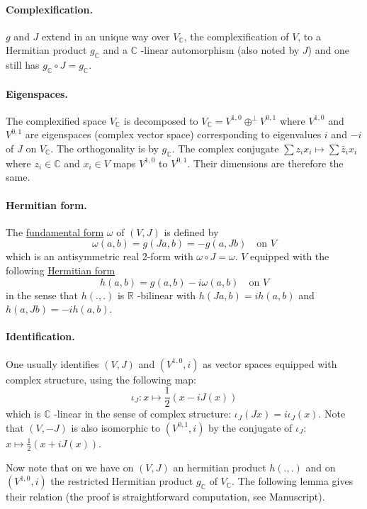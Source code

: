 \documentclass[11pt]{article}
\begin{document}
\paragraph{Complexification.}
\label{sec:orgd598223}
\(g\) and \(J\) extend in an unique way over \(V_{ \mathbb{C}}\), the complexification of \(V\), to a
Hermitian product \(g_{\mathbb{C}}\) and a \(\mathbb{C}\) -linear automorphism (also noted by \(J\)) and one
still has \(g_{\mathbb{C}}\circ J = g_{\mathbb{C}}\).

\paragraph{Eigenspaces.}
\label{sec:org6a06657}
The complexified space \(V_{ \mathbb{C}}\) is decomposed to \(V_{\mathbb{C}} =
V^{1,0} \oplus^\perp V^{0,1}\) where \(V^{1,0}\) and \(V^{0,1}\) are eigenspaces (complex vector space)
corresponding to eigenvalues \(i\) and \(-i\) of \(J\) on \(V_{\mathbb{C}}\). The orthogonality is by
\(g_{\mathbb{C}}\). The complex conjugate \(\sum z_i x_i \mapsto \sum \bar z_i x_i\) where \(z_i\in
\mathbb{C}\) and \(x_i\in V\) maps \(V^{1,0}\) to \(V^{0,1}\). Their dimensions are therefore the same.

\paragraph{Hermitian form.}
\label{sec:org0bc364a}
The \uline{fundamental form} \(\omega\) of \((V,J)\) is defined by
\[
\omega(a,b) = g(Ja,b) = -g(a, Jb) \quad \text{on } V
\]
which is an antisymmetric real 2-form with \(\omega\circ J = \omega\). \(V\) equipped with the following
\uline{Hermitian form}
\[
h(a,b) = g(a,b) - i\omega(a,b)  \quad \text{on } V
\]
in the sense that \(h(.,.)\) is \(\mathbb{R}\) -bilinear with \(h(Ja,b) = ih(a,b)\) and \(h(a,Jb) = -ih(a,b)\).

\paragraph{Identification.}
\label{sec:org5765369}
One usually identifies \((V,J)\) and \((V^{1,0},i)\) as vector spaces equipped with complex structure,
using the following map:
\[
\iota_J: x \mapsto \frac{1}{2}(x - iJ(x))
\]
which is \(\mathbb{C}\) -linear in the sense of complex structure: \(\iota_J(Jx) = i\iota_J(x)\). Note
that \((V,-J)\) is also isomorphic to \((V^{0,1},i)\) by the conjugate of \(\iota_J\): \(x\mapsto
\frac{1}{2}(x + iJ(x))\).

Now note that on we have on \((V,J)\) an hermitian product \(h(.,.)\) and on \((V^{1,0},i)\) the restricted
Hermitian product \(g_{\mathbb{C}}\) of \(V_{\mathbb{C}}\). The following lemma gives their relation
(the proof is straightforward computation, see Manuscript).
\end{document}
